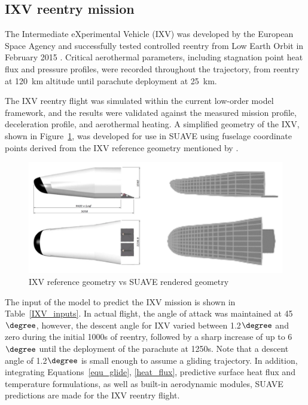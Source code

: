 \documentclass[%
 aip,
 amsmath,amssymb,
preprint,%
]{revtex4-1}
\begin{document}
\subsection{IXV reentry mission}
The Intermediate eXperimental Vehicle (IXV) was developed by the European Space Agency and successfully tested controlled reentry from Low Earth Orbit in February 2015 \citep{haya-ramos_design_2016}. Critical aerothermal parameters, including stagnation point heat flux and pressure profiles, were recorded throughout the trajectory, from reentry at 120~km altitude until parachute deployment at 25~km. 

The IXV reentry flight was simulated within the current low-order model framework, and the results were validated against the measured mission profile, deceleration profile, and aerothermal heating. A simplified geometry of the IXV, shown in Figure~\ref{model}, was developed for use in SUAVE using fuselage coordinate points derived from the IXV reference geometry mentioned by \cite{haya-ramos_design_2016}.

\begin{figure}[ht]
\centering
\includegraphics[width=1\linewidth]{IXV_model.png}
\caption{IXV reference geometry \citep{haya-ramos_design_2016} vs SUAVE rendered geometry}
\label{model}
\end{figure}

The input of the model to predict the IXV mission is shown in Table~\ref{IXV_inputs}. In actual flight, the angle of attack was maintained at 45$\degree$, however, the descent angle for IXV \citep{blau_ixv_2018} varied between 1.2$\degree$ and zero during the initial 1000s of reentry, followed by a sharp increase of up to 6$\degree$ until the deployment of the parachute at 1250s. Note that a descent angle of 1.2$\degree$ is small enough to assume a gliding trajectory. In addition, integrating Equations~\eqref{equ_glide}, \eqref{heat_flux}, predictive surface heat flux and temperature formulations, as well as built-in aerodynamic modules, SUAVE predictions are made for the IXV reentry flight. 
\end{document}

